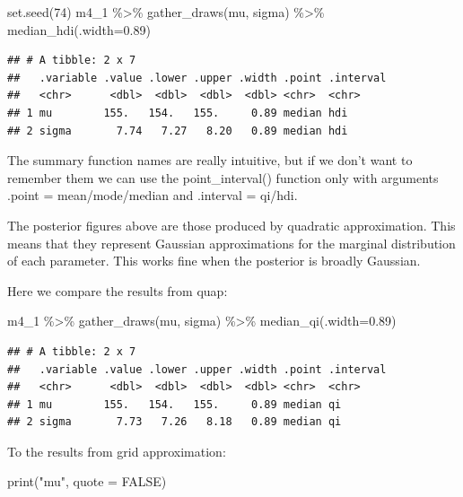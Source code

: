 \documentclass[
]{book}
\newenvironment{Shaded}{\begin{snugshade}}{\end{snugshade}}
\newcommand{\AttributeTok}[1]{\textcolor[rgb]{0.77,0.63,0.00}{#1}}
\newcommand{\ConstantTok}[1]{\textcolor[rgb]{0.00,0.00,0.00}{#1}}
\newcommand{\DecValTok}[1]{\textcolor[rgb]{0.00,0.00,0.81}{#1}}
\newcommand{\FloatTok}[1]{\textcolor[rgb]{0.00,0.00,0.81}{#1}}
\newcommand{\FunctionTok}[1]{\textcolor[rgb]{0.00,0.00,0.00}{#1}}
\newcommand{\NormalTok}[1]{#1}
\newcommand{\SpecialCharTok}[1]{\textcolor[rgb]{0.00,0.00,0.00}{#1}}
\newcommand{\StringTok}[1]{\textcolor[rgb]{0.31,0.60,0.02}{#1}}
\begin{document}
\begin{Shaded}
\begin{Highlighting}[]
\FunctionTok{set.seed}\NormalTok{(}\DecValTok{74}\NormalTok{)}
\NormalTok{m4\_1 }\SpecialCharTok{\%\textgreater{}\%}
  \FunctionTok{gather\_draws}\NormalTok{(mu, sigma) }\SpecialCharTok{\%\textgreater{}\%}
  \FunctionTok{median\_hdi}\NormalTok{(}\AttributeTok{.width=}\FloatTok{0.89}\NormalTok{)}
\end{Highlighting}
\end{Shaded}

\begin{verbatim}
## # A tibble: 2 x 7
##   .variable .value .lower .upper .width .point .interval
##   <chr>      <dbl>  <dbl>  <dbl>  <dbl> <chr>  <chr>    
## 1 mu        155.   154.   155.     0.89 median hdi      
## 2 sigma       7.74   7.27   8.20   0.89 median hdi
\end{verbatim}

The summary function names are really intuitive, but if we don't want to remember them we can use the point\_interval() function only with arguments .point = mean/mode/median and .interval = qi/hdi.

The posterior figures above are those produced by quadratic approximation. This means that they represent Gaussian approximations for the marginal distribution of each parameter. This works fine when the posterior is broadly Gaussian.

Here we compare the results from quap:

\begin{Shaded}
\begin{Highlighting}[]
\NormalTok{m4\_1 }\SpecialCharTok{\%\textgreater{}\%}
  \FunctionTok{gather\_draws}\NormalTok{(mu, sigma) }\SpecialCharTok{\%\textgreater{}\%}
  \FunctionTok{median\_qi}\NormalTok{(}\AttributeTok{.width=}\FloatTok{0.89}\NormalTok{)}
\end{Highlighting}
\end{Shaded}

\begin{verbatim}
## # A tibble: 2 x 7
##   .variable .value .lower .upper .width .point .interval
##   <chr>      <dbl>  <dbl>  <dbl>  <dbl> <chr>  <chr>    
## 1 mu        155.   154.   155.     0.89 median qi       
## 2 sigma       7.73   7.26   8.18   0.89 median qi
\end{verbatim}

To the results from grid approximation:

\begin{Shaded}
\begin{Highlighting}[]
\FunctionTok{print}\NormalTok{(}\StringTok{"mu"}\NormalTok{, }\AttributeTok{quote =} \ConstantTok{FALSE}\NormalTok{)}
\end{Highlighting}
\end{Shaded}
\end{document}
